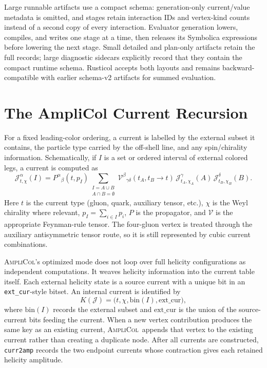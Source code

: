 \documentclass[10pt]{article}
\newcommand{\AC}{\textsc{AmpliCol}}
\newcommand{\J}{\mathcal{J}}
\newcommand{\V}{\mathcal{V}}
\begin{document}
Large runnable artifacts use a compact schema: generation-only current/value
metadata is omitted, and stages retain interaction IDs and vertex-kind counts
instead of a second copy of every interaction.  Evaluator generation lowers,
compiles, and writes one stage at a time, then releases its Symbolica
expressions before lowering the next stage.  Small detailed and plan-only
artifacts retain the full records; large diagnostic sidecars explicitly record
that they contain the compact runtime schema.  Rusticol accepts both layouts
and remains backward-compatible with earlier schema-v2 artifacts for summed
evaluation.

\section{The AmpliCol Current Recursion}

For a fixed leading-color ordering, a current is labelled by the external
subset it contains, the particle type carried by the off-shell line, and any
spin/chirality information.  Schematically, if $I$ is a set or ordered interval
of external colored legs, a current is computed as
\begin{equation}
  \J^\alpha_{t,\chi}(I)
  =
  P^\alpha{}_\beta(t, p_I)
  \sum_{\substack{I=A\cup B\\A\cap B=\emptyset}}
  \V^\beta{}_{\gamma\delta}(t_A,t_B\to t)\,
  \J^\gamma_{t_A,\chi_A}(A)\,
  \J^\delta_{t_B,\chi_B}(B).
  \label{eq:current-recursion}
\end{equation}
Here $t$ is the current type (gluon, quark, auxiliary tensor, etc.),
$\chi$ is the Weyl chirality where relevant, $p_I=\sum_{i\in I}p_i$, $P$ is
the propagator, and $\V$ is the appropriate Feynman-rule tensor.  The
four-gluon vertex is treated through the auxiliary antisymmetric tensor route,
so it is still represented by cubic current combinations.

\AC's optimized mode does not loop over full helicity configurations as
independent computations.  It weaves helicity information into the current
table itself.  Each external helicity state is a source current with a unique
bit in an \texttt{ext\_cur}-style bitset.  An internal current is identified by
\begin{equation}
  K(\J)=\bigl(t,\chi,\mathrm{bin}(I),\mathrm{ext\_cur}\bigr),
  \label{eq:current-key}
\end{equation}
where $\mathrm{bin}(I)$ records the external subset and $\mathrm{ext\_cur}$ is
the union of the source-current bits feeding the current.  When a new vertex
contribution produces the same key as an existing current, \AC\ appends that
vertex to the existing current rather than creating a duplicate node.  After
all currents are constructed, \texttt{curr2amp} records the two endpoint
currents whose contraction gives each retained helicity amplitude.
\end{document}
